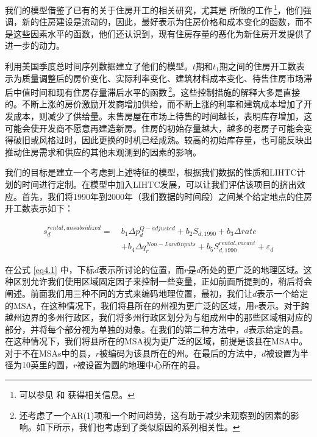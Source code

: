 \documentclass[lang=cn,11pt,a4paper]{paper}
\begin{document}
我们的模型借鉴了已有的关于住房开工的相关研究，尤其是 \cite{Mayer200085} 所做的工作\,\footnote{可以参见 \cite{Topel1988718} 和 \cite{DiPasquale1992337} 获得相关信息。}，他们强调，新的住房建设是流动的，因此，最好表示为住房价格和成本变化的函数，而不是这些因素水平的函数，他们还认识到，现有住房存量的恶化为新住房开发提供了进一步的动力。

\cite{Mayer200085} 利用美国季度总时间序列数据建立了他们的模型。$t$期和$t_1$期之间的住房开工数表示为质量调整后的房价变化、实际利率变化、建筑材料成本变化、待售住房市场滞后中值时间和现有住房存量滞后水平的函数\,\footnote{\cite{Mayer200085} 还考虑了一个AR(1)项和一个时间趋势，这有助于减少未观察到的因素的影响。如下所示，我们也考虑到了类似原因的系列相关性。}。这些控制措施的解释大多是直接的。不断上涨的房价激励开发商增加供给，而不断上涨的利率和建筑成本增加了开发成本，则减少了供给量。未售房屋在市场上待售的时间越长，表明库存增加，这可能会使开发商不愿意再建造新房。住房的初始存量越大，越多的老房子可能会变得破旧或风格过时，因此更换的时机已经成熟。较高的初始库存量，也可能反映出推动住房需求和供应的其他未观测到的因素的影响。

我们的目标是建立一个考虑到上述特征的模型，根据我们数据的性质和LIHTC计划的时间进行定制。在模型中加入LIHTC发展，可以让我们评估该项目的挤出效应。首先，我们将1990年到2000年（我们数据的时间段）之间某个给定地点的住房开工数表示如下：

\begin{equation}\label{eq4.1}
  \begin{aligned}
  s_{d}^{rental,unsubsidized}=\ & b_{1} \Delta p_{d}^{Q-adjusted}+b_{2} S_{d, 1990}+b_{3} \Delta r a t e \\
  &+b_{4} \Delta q_{r}^{Non-Landinputs}+b_{5} S_{d, 1990}^{rental, vacant}+\varepsilon_{d}
  \end{aligned}
\end{equation}
\vspace{2pt}

在公式 \eqref{eq4.1} 中，下标$d$表示所讨论的位置，而$r$是$d$所处的更广泛的地理区域。这种区别允许我们使用区域固定因子来控制一些变量，正如前面所提到的，稍后将会阐述。前面我们用三种不同的方式来编码地理位置，最初，我们让$d$表示一个给定的MSA，在这种情况下，我们将县所在的州视为更广泛的区域，用$r$表示。对于跨越州边界的多州行政区，我们将多州行政区划分为与组成州中的那些区域相对应的部分，并将每个部分视为单独的对象。在我们的第二种方法中，$d$表示给定的县。在这种情况下，我们将县所在的MSA视为更广泛的区域，前提是该县在MSA中。对于不在MSAs中的县，$r$被编码为该县所在的州。在最后的方法中，$d$被设置为半径为10英里的圆，$r$被设置为圆的地理中心所在的县。
\end{document}
